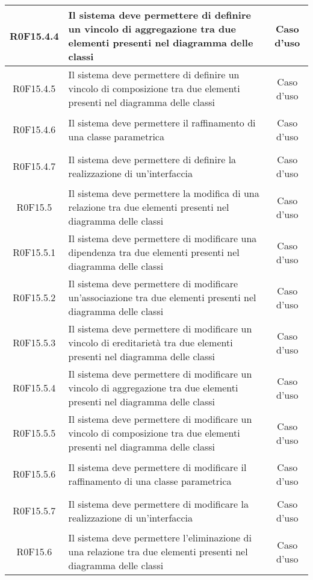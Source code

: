 \documentclass[../AnalisiDeiRequisiti.tex]{subfiles}
\begin{document}
\begin{longtable}{|c|>{\centering}p{7cm}|c|}
	\hypertarget{R0F15.4.4}{R0F15.4.4} & Il sistema deve permettere di definire un vincolo di aggregazione tra due elementi presenti nel diagramma delle classi & Caso d'uso \\ \hline
	\hypertarget{R0F15.4.5}{R0F15.4.5} & Il sistema deve permettere di definire un vincolo di composizione tra due elementi presenti nel diagramma delle classi & Caso d'uso \\ \hline
	\hypertarget{R0F15.4.6}{R0F15.4.6} & Il sistema deve permettere il raffinamento di una classe parametrica & Caso d'uso \\ \hline
	\hypertarget{R0F15.4.7}{R0F15.4.7} & Il sistema deve permettere di definire la realizzazione di un'interfaccia & Caso d'uso \\ \hline
	\hypertarget{R0F15.5}{R0F15.5} & Il sistema deve permettere la modifica di una relazione tra due elementi presenti nel diagramma delle classi & Caso d'uso \\ \hline
	\hypertarget{R0F15.5.1}{R0F15.5.1} & Il sistema deve permettere di modificare una dipendenza tra due elementi presenti nel diagramma delle classi & Caso d'uso \\ \hline
	\hypertarget{R0F15.5.2}{R0F15.5.2} & Il sistema deve permettere di modificare un'associazione tra due elementi presenti nel diagramma delle classi & Caso d'uso \\ \hline
	\hypertarget{R0F15.5.3}{R0F15.5.3} & Il sistema deve permettere di modificare un vincolo di ereditarietà tra due elementi presenti nel diagramma delle classi & Caso d'uso \\ \hline
	\hypertarget{R0F15.5.4}{R0F15.5.4} & Il sistema deve permettere di modificare un vincolo di aggregazione tra due elementi presenti nel diagramma delle classi & Caso d'uso \\ \hline
	\hypertarget{R0F15.5.5}{R0F15.5.5} & Il sistema deve permettere di modificare un vincolo di composizione tra due elementi presenti nel diagramma delle classi & Caso d'uso \\ \hline
	\hypertarget{R0F15.5.6}{R0F15.5.6} & Il sistema deve permettere di modificare il raffinamento di una classe parametrica  & Caso d'uso \\ \hline
	\hypertarget{R0F15.5.7}{R0F15.5.7} & Il sistema deve permettere di modificare la realizzazione di un'interfaccia & Caso d'uso \\ \hline
	\hypertarget{R0F15.6}{R0F15.6} & Il sistema deve permettere l'eliminazione di una relazione tra due elementi presenti nel diagramma delle classi & Caso d'uso \\ \hline

\end{longtable}
\end{document}
